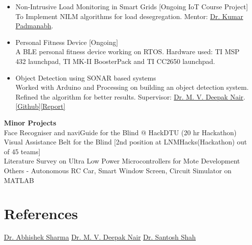\documentclass[]{friggeri-cv}
\begin{document}
\begin{itemize}
    \item Non-Intrusive Load Monitoring in Smart Grids [Ongoing IoT Course Project]\\
    {\small To Implement NILM algorithms for load desegregation. Mentor: \href{http://www.lnmiit.ac.in/Department/CSE/Department_FacultyProfile.aspx?nDeptID=20296}{Dr. Kumar Padmanabh}.}
    \item Personal Fitness Device [Ongoing]\\
    {\small A BLE personal fitness device working on RTOS. Hardware used: TI MSP 432 launchpad, TI MK-II BoosterPack and TI CC2650 launchpad.}
    \item Object Detection using SONAR based systems\\
    {\small Worked with Arduino and Processing on building an object detection system. Refined the algorithm for better results. Supervisor: \href{http://www.lnmiit.ac.in/Department/ECE/ece_FacultyProfile.aspx?nDeptID=20269}{Dr. M. V. Deepak Nair}.\qquad \qquad \qquad \qquad \qquad \qquad \qquad  \href{https://github.com/suryabvsp/sonar-project}{[Github]}\href{https://github.com/suryabvsp/sonar-project/blob/master/Sonar%20Project%20Report.pdf} {[Report]}}
\end{itemize}
\normalsize{\textbf{Minor Projects}}\\
    {\small Face Recogniser and naviGuide for the Blind @ HackDTU (20 hr Hackathon)\\
    Visual Assistance Belt for the Blind [2nd position at LNMHacks(Hackathon) out of 45 teams]\\
    Literature Survey on Ultra Low Power Microcontrollers for Mote Development\\
    Others - Autonomous RC Car, Smart Window Screen, Circuit Simulator on MATLAB}
\section{References}
\href{http://lnmiit.ac.in/Department/ECE/ece_FacultyProfile.aspx?nDeptID=119}{Dr. Abhishek Sharma} \qquad \href{http://www.lnmiit.ac.in/Department/ECE/ece_FacultyProfile.aspx?nDeptID=20269}{Dr. M. V. Deepak Nair} \qquad \href{http://www.lnmiit.ac.in/Department/ECE/ece_FacultyProfile.aspx?nDeptID=189}{Dr. Santosh Shah}
% 
\end{document}
